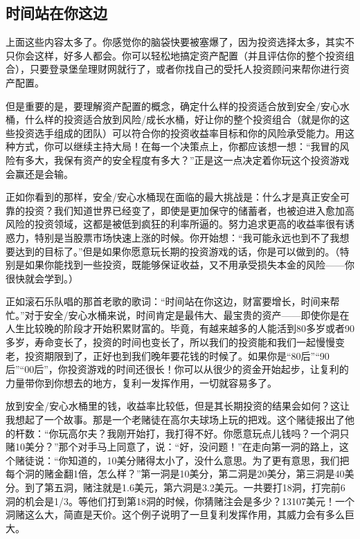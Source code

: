 \subsection{时间站在你这边}

上面这些内容太多了。你感觉你的脑袋快要被塞爆了，因为投资选择太多，其实不只你会这样，好多人都会。你可以轻松地搞定资产配置（并且评估你的整个投资组合），只要登录堡垒理财网就行了，或者你找自己的受托人投资顾问来帮你进行资产配置。

但是重要的是，要理解资产配置的概念，确定什么样的投资适合放到安全/安心水桶，什么样的投资适合放到风险/成长水桶，好让你的整个投资组合（就是你的这些投资选手组成的团队）可以符合你的投资收益率目标和你的风险承受能力。用这种方式，你可以继续主持大局！在每一个决策点上，你都应该想一想：“我冒的风险有多大，我保有资产的安全程度有多大？”正是这一点决定着你玩这个投资游戏会赢还是会输。

正如你看到的那样，安全/安心水桶现在面临的最大挑战是：什么才是真正安全可靠的投资？我们知道世界已经变了，即使是更加保守的储蓄者，也被迫进入愈加高风险的投资领域，这都是被低到疯狂的利率所逼的。努力追求更高的收益率很有诱惑力，特别是当股票市场快速上涨的时候。你开始想：“我可能永远也到不了我想要达到的目标了。”但是如果你愿意玩长期的投资游戏的话，你是可以做到的。（特别是如果你能找到一些投资，既能够保证收益，又不用承受损失本金的风险——你很快就会学到。）

正如滚石乐队唱的那首老歌的歌词：“时间站在你这边，财富要增长，时间来帮忙。”对于安全/安心水桶来说，时间肯定是最伟大、最宝贵的资产——即使你是在人生比较晚的阶段才开始积累财富的。毕竟，有越来越多的人能活到80多岁或者90多岁，寿命变长了，投资的时间也变长了，所以我们的投资能和我们一起慢慢变老，投资期限到了，正好也到我们晚年要花钱的时候了。如果你是“80后”“90后”“00后”，你投资游戏的时间还很长！你可以从很少的资金开始起步，让复利的力量带你到你想去的地方，复利一发挥作用，一切就容易多了。

放到安全/安心水桶里的钱，收益率比较低，但是其长期投资的结果会如何？这让我想起了一个故事。那是一个老赌徒在高尔夫球场上玩的把戏。这个赌徒报出了他的杆数：“你玩高尔夫？我刚开始打，我打得不好。你愿意玩点儿钱吗？一个洞只赌10美分？”那个对手马上同意了，说：“好，没问题！”在走向第一洞的路上，这个赌徒说：“你知道的，10美分赌得太小了，没什么意思。为了更有意思，我们把每个洞的赌金翻1倍，怎么样？”第一洞是10美分，第二洞是20美分，第三洞是40美分。到了第五洞，赌注就是1.6美元，第六洞是3.2美元。一共要打18洞，打完前6洞的机会是1/3。等他们打到第18洞的时候，你猜赌注会是多少？13107美元！一个洞赌这么大，简直是天价。这个例子说明了一旦复利发挥作用，其威力会有多么巨大。

